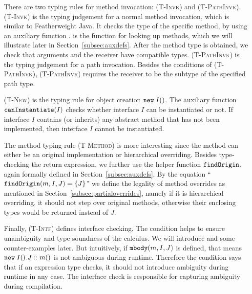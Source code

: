 There are two typing rules for method invocation: \textsc{(T-Invk)} and \textsc{(T-PathInvk)}. \textsc{(T-Invk)} is the typing judgement for a normal method invocation, which is similar to Featherweight Java. It checks the type of the specific method, by using an auxiliary function \mbody. \mbody is the function for looking up methods, which we will illustrate later in Section~\ref{subsec:auxdefs}. After the method type is obtained, we check that arguments and the receiver have compatible types. \textsc{(T-PathInvk)} is the typing judgement for a path invocation. Besides the conditions of \textsc{(T-PathInvk)}, \textsc{(T-PathInvk)} requires the receiver to be the subtype of the specified
path type. 

\textsc{(T-New)} is the typing rule for object creation $\texttt{new} \; I()$. The auxiliary function $\texttt{canInstantiate}(I)$ checks whether interface $I$ can be instantiated or not. If interface $I$ contains (or inherits) any abstract method that has not been implemented, then interface $I$ cannot be instantiated.

The method typing rule \textsc{(T-Method)} is more interesting since the method can either be an original implementation or hierarchical overriding.
Besides type-checking the return expression,
we further use the helper function $\texttt{findOrigin}$, again formally defined in Section~\ref{subsec:auxdefs}.
By the equation ``$\texttt{findOrigin}(m, I, J) = \{J\}$'' we define the legality of method overrides as mentioned in Section~\ref{subsec:partialoverrides}, namely if it is hierarchical overriding, it should not step over original methods, otherwise
their enclosing types would be returned instead of $J$.

Finally, \textsc{(T-Intf)} defines interface checking. The
condition helps to ensure unambiguity and type soundness of the calculus. We will
introduce \mbody{} and some counter-examples later. But intuitively, if $\texttt{mbody}(m,I,J)$ is defined, that means $\texttt{new} \; I().J::m()$ is not
ambiguous during runtime. Therefore the condition says that if an expression type checks, it should not introduce ambiguity during runtime
in any case. The interface check is responsible for capturing ambiguity during compilation.


